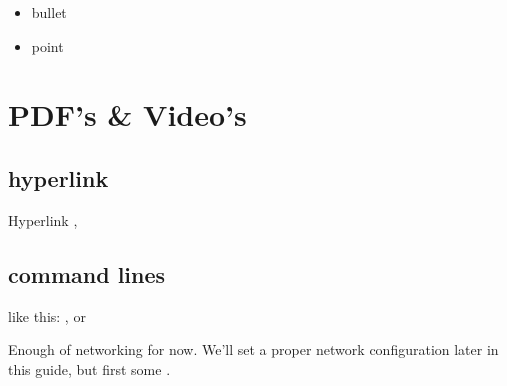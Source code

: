 \documentclass[letterpaper,10pt,openany,oneside,english]{sphinxmanual}
\begin{document}
\sphinxAtStartPar
{}
\begin{itemize}
\item {} 
\sphinxAtStartPar
bullet

\item {} 
\sphinxAtStartPar
point

\end{itemize}


\chapter{PDF’s \& Video’s}
\label{\detokenize{docsandvideos:pdf-s-video-s}}\label{\detokenize{docsandvideos::doc}}

\section{hyperlink}
\label{\detokenize{docsandvideos:hyperlink}}
\sphinxAtStartPar
Hyperlink ,


\section{command lines}
\label{\detokenize{docsandvideos:command-lines}}
\sphinxAtStartPar
like this: ,  or

\sphinxAtStartPar
Enough of networking for now. We’ll set a proper network configuration later in this guide, but first some .
\end{document}
